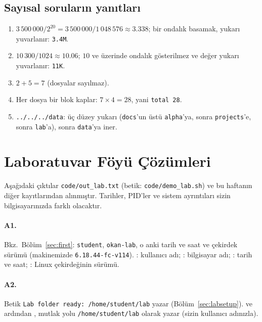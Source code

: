\subsection*{Sayısal soruların yanıtları}
\begin{enumerate}[leftmargin=1.6em,start=10]
  \item $3\,500\,000 / 2^{20} = 3\,500\,000 / 1\,048\,576 \approx 3.338$; bir ondalık basamak, yukarı yuvarlanır: \texttt{3.4M}.
  \item $10\,300 / 1024 \approx 10.06$; $10$ ve üzerinde ondalık gösterilmez ve değer yukarı yuvarlanır: \texttt{11K}.
  \item $2 + 5 = 7$ (dosyalar sayılmaz).
  \item Her dosya bir blok kaplar: $7 \times 4 = 28$, yani \texttt{total 28}.
  \item \texttt{../../../data}: üç düzey yukarı (\texttt{docs}'un üstü \texttt{alpha}'ya, sonra \texttt{projects}'e, sonra \texttt{lab}'a), sonra \texttt{data}'ya iner.
\end{enumerate}

\section{Laboratuvar Föyü Çözümleri}
\label{sec:labsol}

Aşağıdaki çıktılar \texttt{code/out\_lab.txt} (betik: \texttt{code/demo\_lab.sh}) ve bu haftanın diğer kayıtlarından alınmıştır. Tarihler, PID'ler ve sistem ayrıntıları sizin bilgisayarınızda farklı olacaktır.

\paragraph{A1.} Bkz.\ Bölüm~\ref{sec:first}: \texttt{student}, \texttt{okan-lab}, o anki tarih ve saat ve çekirdek sürümü (makinemizde \texttt{6.18.44-fc-v114}). : kullanıcı adı; : bilgisayar adı; : tarih ve saat; : Linux çekirdeğinin sürümü.

\paragraph{A2.} Betik \texttt{Lab folder ready: /home/student/lab} yazar (Bölüm~\ref{sec:labsetup}).  ve ardından , mutlak yolu \texttt{/home/student/lab} olarak yazar (sizin kullanıcı adınızla).


